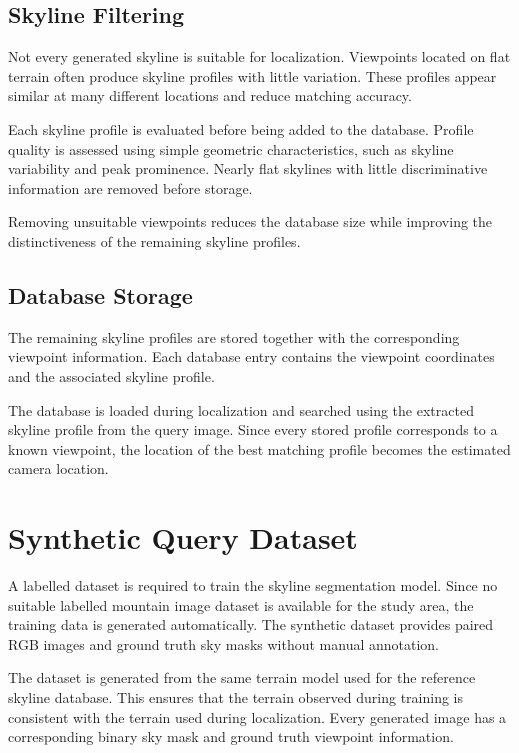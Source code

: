 \subsection{Skyline Filtering}

Not every generated skyline is suitable for localization. Viewpoints located on flat terrain often produce skyline profiles with little variation. These profiles appear similar at many different locations and reduce matching accuracy.

Each skyline profile is evaluated before being added to the database. Profile quality is assessed using simple geometric characteristics, such as skyline variability and peak prominence. Nearly flat skylines with little discriminative information are removed before storage.

Removing unsuitable viewpoints reduces the database size while improving the distinctiveness of the remaining skyline profiles.

\subsection{Database Storage}

The remaining skyline profiles are stored together with the corresponding viewpoint information. Each database entry contains the viewpoint coordinates and the associated skyline profile.

The database is loaded during localization and searched using the extracted skyline profile from the query image. Since every stored profile corresponds to a known viewpoint, the location of the best matching profile becomes the estimated camera location.

\section{Synthetic Query Dataset}

A labelled dataset is required to train the skyline segmentation model. Since no suitable labelled mountain image dataset is available for the study area, the training data is generated automatically. The synthetic dataset provides paired RGB images and ground truth sky masks without manual annotation.

The dataset is generated from the same terrain model used for the reference skyline database. This ensures that the terrain observed during training is consistent with the terrain used during localization. Every generated image has a corresponding binary sky mask and ground truth viewpoint information.

